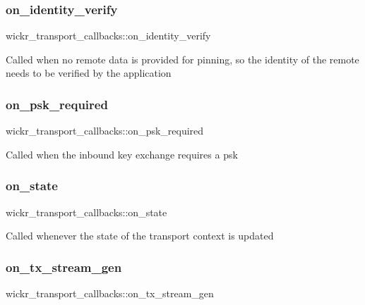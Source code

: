 \subsubsection{\texorpdfstring{on\_identity\_verify}{on\_identity\_verify}}
{\footnotesize\ttfamily wickr\+\_\+transport\+\_\+callbacks\+::on\+\_\+identity\+\_\+verify}

Called when no remote data is provided for pinning, so the identity of the remote needs to be verified by the application \mbox{\label{structwickr__transport__callbacks_af01227bfe19f056de55669d79ed7c120}} 
\subsubsection{\texorpdfstring{on\_psk\_required}{on\_psk\_required}}
{\footnotesize\ttfamily wickr\+\_\+transport\+\_\+callbacks\+::on\+\_\+psk\+\_\+required}

Called when the inbound key exchange requires a psk \mbox{\label{structwickr__transport__callbacks_afef0716506b88885c57fda652500b3da}} 
\subsubsection{\texorpdfstring{on\_state}{on\_state}}
{\footnotesize\ttfamily wickr\+\_\+transport\+\_\+callbacks\+::on\+\_\+state}

Called whenever the state of the transport context is updated \mbox{\label{structwickr__transport__callbacks_a1b6ee026d404a5b267e0c680dc9c2337}} 
\subsubsection{\texorpdfstring{on\_tx\_stream\_gen}{on\_tx\_stream\_gen}}
{\footnotesize\ttfamily wickr\+\_\+transport\+\_\+callbacks\+::on\+\_\+tx\+\_\+stream\+\_\+gen}

